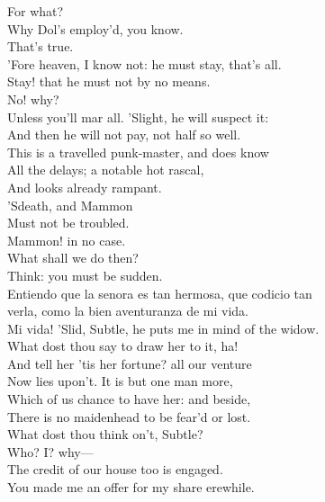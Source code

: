 \documentclass[a4paper,oneside]{memoir}
\begin{document}
\begin{drama*}
\subtlespeaks For what?\\
\facespeaks {} Why Dol's employ'd, you know.\\
\subtlespeaks {} That's true.\\
'Fore heaven, I know not: he must stay, that's all.\\
\facespeaks Stay! that he must not by no means.\\
\subtlespeaks {} No! why?\\
\facespeaks Unless you'll mar all. 'Slight, he will suspect it:\\
And then he will not pay, not half so well.\\
This is a travelled punk-master, and does know\\
All the delays; a notable hot rascal,\\
And looks already rampant.\\
\subtlespeaks {} 'Sdeath, and Mammon\\
Must not be troubled.\\
\facespeaks {} Mammon! in no case.\\
\subtlespeaks What shall we do then?\\
\facespeaks {} Think: you must be sudden.\\
\surlyspeaks Entiendo que la senora es tan hermosa, que codicio tan\\
verla, como la bien aventuranza de mi vida.\\
\facespeaks Mi vida! 'Slid, Subtle, he puts me in mind of the widow.\\
What dost thou say to draw her to it, ha!\\
And tell her 'tis her fortune? all our venture\\
Now lies upon't. It is but one man more,\\
Which of us chance to have her: and beside,\\
There is no maidenhead to be fear'd or lost.\\
What dost thou think on't, Subtle?\\
\subtlespeaks {} Who? I? why---\\
\facespeaks The credit of our house too is engaged.\\
\subtlespeaks You made me an offer for my share erewhile.\\

\end{drama*}
\end{document}
